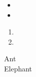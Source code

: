 \documentclass{article}
\begin{document}
\begin{itemize}
  \item \blindtext
  \item \blindtext
\end{itemize}

\begin{enumerate}
  \item \blindtext
  \item \blindtext
\end{enumerate}

\begin{description}
  \item [Ant] \blindtext
  \item [Elephant] \blindtext
\end{description}
\end{document}
